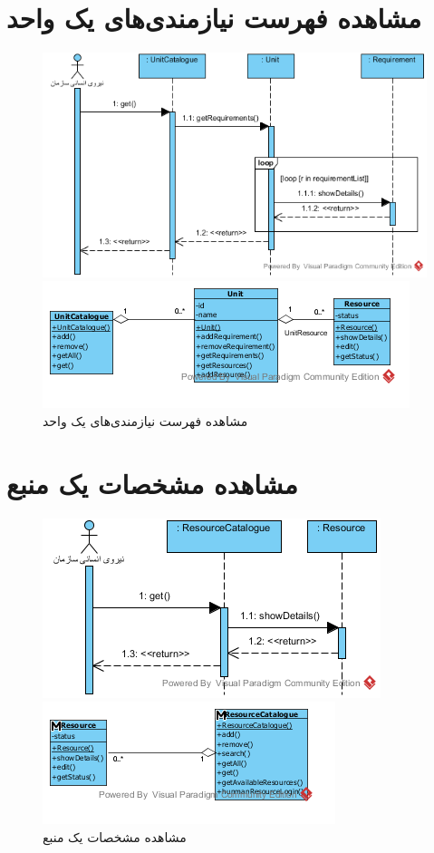 \section{مشاهده فهرست نیازمندی‌های یک واحد}
\begin{figure}[H]
	\centering
	\includegraphics[scale=1]{img/sequence-analysis/ViewListOfRequirements}
	
	
	\includegraphics[scale=1]{img/sequence-analysis/ViewListOfRequirementsC}
	\caption{مشاهده فهرست نیازمندی‌های یک واحد}
\end{figure}


\section{مشاهده مشخصات یک منبع}
\begin{figure}[H]
	\centering
	\includegraphics[scale=1]{img/sequence-analysis/ViewResourceAttributes}
	
	
	\includegraphics[scale=1]{img/sequence-analysis/ViewResourceAttributesC}
	\caption{مشاهده مشخصات یک منبع}
\end{figure}

